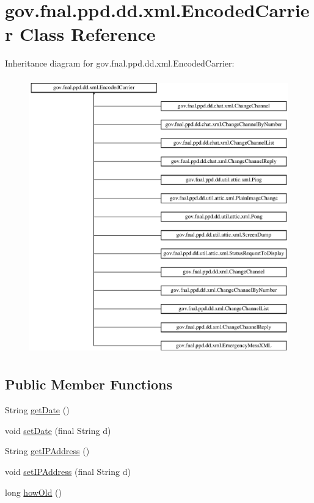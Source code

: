 \hypertarget{classgov_1_1fnal_1_1ppd_1_1dd_1_1xml_1_1EncodedCarrier}{\section{gov.\-fnal.\-ppd.\-dd.\-xml.\-Encoded\-Carrier Class Reference}
\label{classgov_1_1fnal_1_1ppd_1_1dd_1_1xml_1_1EncodedCarrier}
}
Inheritance diagram for gov.\-fnal.\-ppd.\-dd.\-xml.\-Encoded\-Carrier\-:\begin{figure}[H]
\begin{center}
\leavevmode
\includegraphics[height=12.000000cm]{classgov_1_1fnal_1_1ppd_1_1dd_1_1xml_1_1EncodedCarrier}
\end{center}
\end{figure}
\subsection*{Public Member Functions}
\begin{DoxyCompactItemize}
\item 
String \hyperlink{classgov_1_1fnal_1_1ppd_1_1dd_1_1xml_1_1EncodedCarrier_a7f0d7411aee2e510e85b66cf111fb51c}{get\-Date} ()
\item 
void \hyperlink{classgov_1_1fnal_1_1ppd_1_1dd_1_1xml_1_1EncodedCarrier_ac801c5a72181571aeaddff4321669133}{set\-Date} (final String d)
\item 
String \hyperlink{classgov_1_1fnal_1_1ppd_1_1dd_1_1xml_1_1EncodedCarrier_a27e11d86bf75a88340237c060038b288}{get\-I\-P\-Address} ()
\item 
void \hyperlink{classgov_1_1fnal_1_1ppd_1_1dd_1_1xml_1_1EncodedCarrier_a8f73e4716b57c5330045fb2868252904}{set\-I\-P\-Address} (final String d)
\item 
long \hyperlink{classgov_1_1fnal_1_1ppd_1_1dd_1_1xml_1_1EncodedCarrier_a2ebe62987fc3e79a6a32f636935da736}{how\-Old} ()
\end{DoxyCompactItemize}

